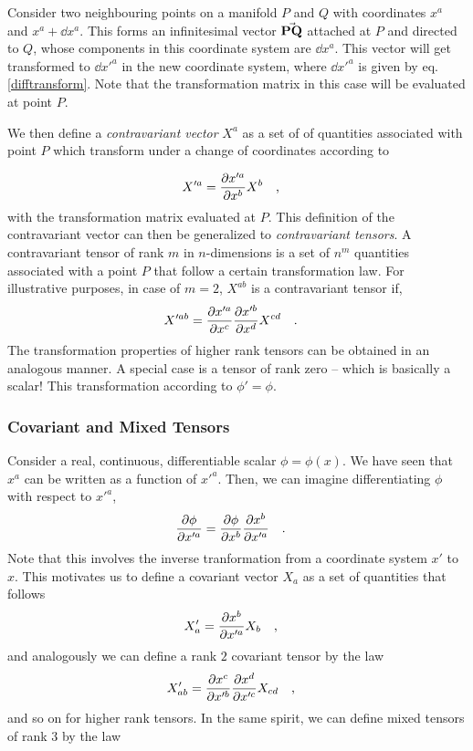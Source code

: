 \documentclass[a4paper,11pt]{article}
\begin{document}
Consider two neighbouring points on a manifold $ P $ and $ Q $ with coordinates $ x^a $ and $ x^a + \dd{x^a} $. This forms an infinitesimal vector $ \va{PQ} $ attached at $ P $ and directed to $ Q $, whose components in this coordinate system are $ \dd{x^a} $. This vector will get transformed to $ \dd{x'^a} $ in the new coordinate system, where $ \dd{x'^a} $ is given by eq. \ref{difftransform}. Note that the transformation matrix in this case will be evaluated at point $ P $.

We then define a \textit{contravariant vector} $ X^a $ as a set of of quantities associated with point $ P $ which transform under a change of coordinates according to

\begin{equation}\label{key}
X'^a = \pdv{x'^a}{x^b} X^b \qq{,}
\end{equation}
with the transformation matrix evaluated at $ P $. This definition of the contravariant vector can then be generalized to \textit{contravariant tensors}. A contravariant tensor of rank $ m $ in $ n $-dimensions is a set of $ n^m $ quantities associated with a point $ P $ that follow a certain transformation law. For illustrative purposes, in case of $ m=2 $, $ X^{ab} $ is a contravariant tensor if,
\begin{equation}\label{key}
X'^{ab} =  \pdv{x'^a}{x^c}  \pdv{x'^b}{x^d} X^{cd} \qq{.}
 \end{equation}
The transformation properties of higher rank tensors can be obtained in an analogous manner. A special case is a tensor of rank zero -- which is basically a scalar! This transformation according to $ \phi' = \phi $.

\subsubsection{Covariant and Mixed Tensors}
Consider a real, continuous, differentiable scalar $ \phi = \phi(x) $. We have seen that $ x^a $ can be written as a function of $ x'^a $. Then, we can imagine differentiating $ \phi $ with respect to $ x'^a $,
\begin{equation}\label{key}
\pdv{\phi}{x'^a} = \pdv{\phi}{x^b} \pdv{x^b}{x'^a} \qq{.}
\end{equation}
Note that this involves the inverse tranformation from a coordinate system $ x' $ to $ x $. This motivates us to define a covariant vector $ X_a $ as a set of quantities that follows
\begin{equation}\label{key}
X'_a = \pdv{x^b}{x'^a} X_b \qq{,}
\end{equation}
and analogously we can define a rank $ 2 $ covariant tensor by the law
\begin{equation}\label{key}
X'_{ab} = \pdv{x^c}{x'^b} \pdv{x^d}{x'^c} X_{cd} \qq{,}
\end{equation}
and so on for higher rank tensors. In the same spirit, we can define mixed tensors of rank $ 3 $ by the law
\end{document}
